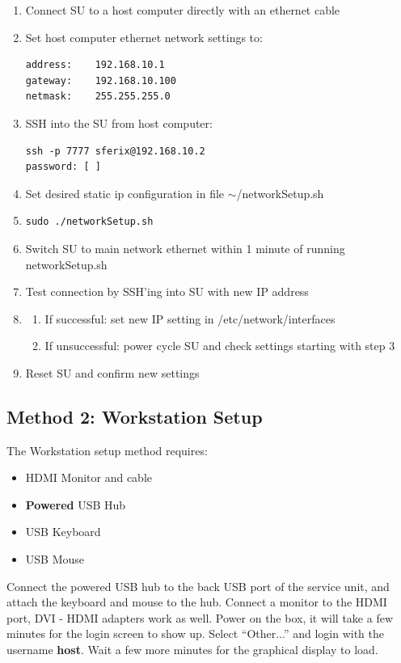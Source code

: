 \begin{enumerate}
\item{Connect SU to a host computer directly with an ethernet cable}
\item{Set host computer ethernet network settings to:
\begin{verbatim}
address:	192.168.10.1
gateway:	192.168.10.100
netmask:	255.255.255.0
\end{verbatim}}
\item{SSH into the SU from host computer:
\begin{verbatim}
ssh -p 7777 sferix@192.168.10.2
password: [	]
\end{verbatim}}
\item{Set desired static ip configuration in file $\sim$/networkSetup.sh}
\item{\begin{verbatim}
sudo ./networkSetup.sh
\end{verbatim}}
\item{Switch SU to main network ethernet within 1 minute of running networkSetup.sh}
\item{Test connection by SSH'ing into SU with new IP address}
\item{
\begin{enumerate}
\item{If successful: set new IP setting in /etc/network/interfaces}
\item{If unsuccessful: power cycle SU and check settings starting with step 3}
\end{enumerate}}
\item{Reset SU and confirm new settings}
\end{enumerate}

\subsection*{Method 2: Workstation Setup}
The Workstation setup method requires:
\begin{itemize}
\item{HDMI Monitor and cable}
\item{{\bf Powered} USB Hub}
\item{USB Keyboard}
\item{USB Mouse}
\end{itemize}

Connect the powered USB hub to the back USB port of the service unit, and attach the keyboard and mouse to the hub.
Connect a monitor to the HDMI port, DVI - HDMI adapters work as well.
Power on the box, it will take a few minutes for the login screen to show up.
Select ``Other...'' and login with the username \textbf{host}.
Wait a few more minutes for the graphical display to load.

